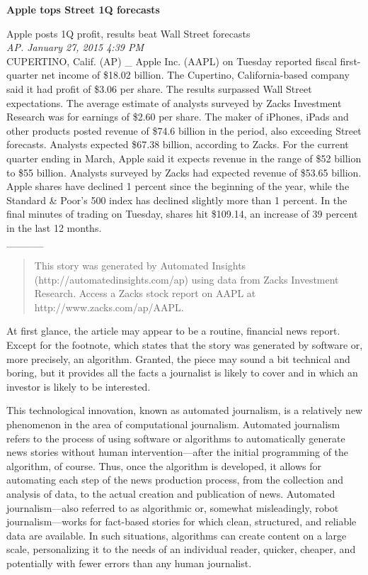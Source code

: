 \documentclass[notoc, symmetric, nobib, nols]{towcenter-guideto-book}
\begin{document}
\begin{framed}
\noindent\textbf{Apple tops Street 1Q forecasts}

\noindent Apple posts 1Q profit, results beat Wall Street forecasts\\[0.5cm]

\noindent\textit{AP. January 27, 2015 4:39 PM}\\[0.2cm]

CUPERTINO, Calif. (AP) \_ Apple Inc. (AAPL) on Tuesday reported fiscal first-quarter net income of \$18.02 billion. The Cupertino, California-based company said it had profit of \$3.06 per share. The results surpassed Wall Street expectations. The average estimate of analysts surveyed by Zacks Investment Research was for earnings of \$2.60 per share. The maker of iPhones, iPads and other products posted revenue of \$74.6 billion in the period, also exceeding Street forecasts. Analysts expected \$67.38 billion, according to Zacks. For the current quarter ending in March, Apple said it expects revenue in the range of \$52 billion to \$55 billion. Analysts surveyed by Zacks had expected revenue of \$53.65 billion. Apple shares have declined 1 percent since the beginning of the year, while the Standard \& Poor's 500 index has declined slightly more than 1 percent. In the final minutes of trading on Tuesday, shares hit \$109.14, an increase of 39 percent in the last 12 months.
\\[0.1cm]
\noindent\_\_\_\_\_
\\[0.1cm]
\begin{quote} This story was generated by Automated Insights (http://automatedinsights.com/ap) using data from Zacks Investment Research. Access a Zacks stock report on AAPL at http://www.zacks.com/ap/AAPL.\end{quote}
\end{framed}

At first glance, the article may appear to be a routine, financial news report. Except for the footnote, which states that the story was generated by software or, more precisely, an algorithm. Granted, the piece may sound a bit technical and boring, but it provides all the facts a journalist is likely to cover and in which an investor is likely to be interested. 

This technological innovation, known as automated journalism, is a relatively new phenomenon in the area of computational journalism. Automated journalism refers to the process of using software or algorithms to automatically generate news stories without human intervention---after the initial programming of the algorithm, of course. Thus, once the algorithm is developed, it allows for automating each step of the news production process, from the collection and analysis of data, to the actual creation and publication of news. Automated journalism---also referred to as algorithmic\autocite{doerr15} or, somewhat misleadingly, robot journalism\autocite{oremus15}---works for fact-based stories for which clean, structured, and reliable data are available. In such situations, algorithms can create content on a large scale, personalizing it to the needs of an individual reader, quicker, cheaper, and potentially with fewer errors than any human journalist. 
\end{document}
